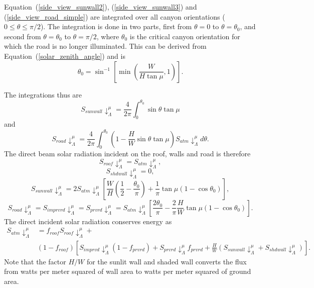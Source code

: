 \documentclass[12pt,authoryear]{elsarticle}
\numberwithin{equation}{section} %
\begin{document}
Equation~(\ref{side_view_sunwall2}), (\ref{side_view_sunwall3}) and (\ref{side_view_road_simple}) are integrated over all canyon orientations ($0\leq\theta\leq\pi/2$). The integration is done in two parts, first from $\theta=0$ to $\theta=\theta_{0}$, and second from $\theta=\theta_{0}$ to $\theta=\pi/2$, where $\theta_{0}$ is the critical canyon orientation for which the road is no longer illuminated. This can be derived from Equation~(\ref{solar_zenith_angle}) and is
\begin{equation}
\theta_{0}=\sin^{-1}\left[\min\left(\frac{W}{H\tan\mu},1\right)\right].
\end{equation}

The integrations thus are 
\begin{equation}
S_{sunwall}\downarrow_{\Lambda}^{\mu}=\frac{4}{2\pi}\int_{0}^{\theta_{0}}\sin\theta\tan\mu
\end{equation}
and 
\begin{equation}
S_{road}\downarrow_\Lambda^{\mu}=\frac{4}{2\pi}\int_{0}^{\theta_{0}}\left(1-\frac{H}{W}\sin\theta\tan\mu\right)S_{atm}\downarrow_{\Lambda}^{\mu}d\theta.
\end{equation}
The direct beam solar radiation incident on the roof, walls and road is therefore
\begin{equation}
S_{roof}\downarrow_{\Lambda}^{\mu}=S_{atm}\downarrow_{\Lambda}^{\mu},
\end{equation}
\begin{equation}
S_{shdwall}\downarrow_{\Lambda}^{\mu}=0,
\end{equation}
\begin{equation}
S_{sunwall}\downarrow_{\Lambda}^{\mu}=2S_{atm}\downarrow_{\Lambda}^{\mu}\left[\frac{W}{H}\left(\frac{1}{2}-\frac{\theta_{0}}{\pi}\right)+\frac{1}{\pi}\tan\mu(1-\cos\theta_{0})\right],
\end{equation}
\begin{equation}
\label{eq:downward_direct_incident_solar_radiation}
S_{road}\downarrow_{\Lambda}^{\mu}=S_{imprvrd}\downarrow_{\Lambda}^{\mu}=S_{prvrd}\downarrow_{\Lambda}^{\mu}=S_{atm}\downarrow_{\Lambda}^{\mu}\left[\frac{2\theta_{0}}{\pi}-\frac{2}{\pi}\frac{H}{W}\tan\mu(1-\cos\theta_{0})\right].
\end{equation}
The direct incident solar radiation conserves energy as
\begin{equation}
\begin{aligned}
S_{atm}\downarrow_{\Lambda}^{\mu} &=f_{roof}S_{roof}\downarrow_{\Lambda}^{\mu} +\\ 
& (1-f_{roof})\left[S_{imprvd}\downarrow_{\Lambda}^{\mu}(1-f_{prvrd})+S_{prvrd}\downarrow_{\Lambda}^{\mu}f_{prvrd}+\frac{H}{W}\left(S_{sunwall}\downarrow_{\Lambda}^{\mu}+S_{shdwall}\downarrow_{\Lambda}^{\mu}\right)\right].
\end{aligned}
\end{equation}
Note that the factor $H/W$ for the sunlit wall and shaded wall converts the flux from watts per meter squared of wall area to watts per meter squared of ground area.
\end{document}
